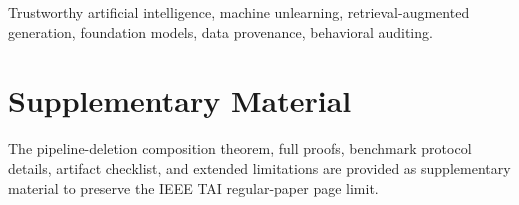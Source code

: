 \documentclass[10pt,journal,compsoc]{IEEEtran}
\begin{document}
\begin{IEEEkeywords}
Trustworthy artificial intelligence, machine unlearning, retrieval-augmented generation, foundation models, data provenance, behavioral auditing.
\end{IEEEkeywords}












\section*{Supplementary Material}
The pipeline-deletion composition theorem, full proofs, benchmark protocol details, artifact checklist, and extended limitations are provided as supplementary material to preserve the IEEE TAI regular-paper page limit.



\end{document}
